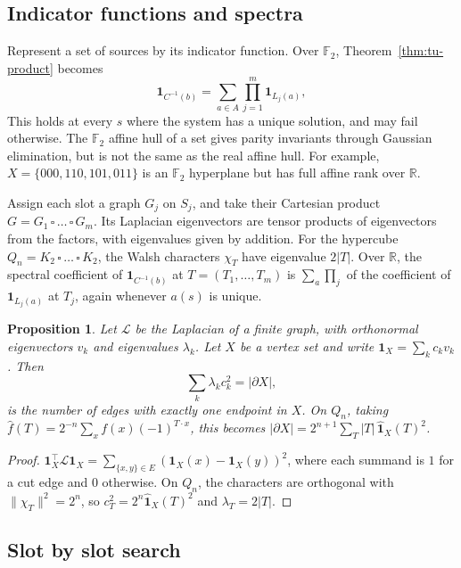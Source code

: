 \documentclass[11pt]{article}
\newtheorem{proposition}[theorem]{Proposition}
\theoremstyle{definition}
\theoremstyle{remark}
\newcommand{\F}{\mathbb{F}}
\begin{document}
\subsection{Indicator functions and spectra}

Represent a set of sources by its indicator function. Over $\F_2$, Theorem~\ref{thm:tu-product} becomes
\[
  \mathbf{1}_{C^{-1}(b)} = \sum_{a \in A} \prod_{j=1}^m \mathbf{1}_{L_j(a)},
\]
This holds at every $s$ where the system has a unique solution, and may fail otherwise. The $\F_2$ affine hull of a set gives parity invariants through Gaussian elimination, but is not the same as the real affine hull. For example, $X = \{000, 110, 101, 011\}$ is an $\F_2$ hyperplane but has full affine rank over $\mathbb{R}$.

Assign each slot a graph $G_j$ on $S_j$, and take their Cartesian product $G = G_1 \,\square\, \dots \,\square\, G_m$. Its Laplacian eigenvectors are tensor products of eigenvectors from the factors, with eigenvalues given by addition. For the hypercube $Q_n = K_2 \,\square\, \dots \,\square\, K_2$, the Walsh characters $\chi_T$ have eigenvalue $2|T|$. Over $\mathbb{R}$, the spectral coefficient of $\mathbf{1}_{C^{-1}(b)}$ at $T = (T_1, \dots, T_m)$ is $\sum_a \prod_j$ of the coefficient of $\mathbf{1}_{L_j(a)}$ at $T_j$, again whenever $a(s)$ is unique.

\begin{proposition}
Let $\mathcal{L}$ be the Laplacian of a finite graph, with orthonormal eigenvectors $v_k$ and eigenvalues $\lambda_k$. Let $X$ be a vertex set and write $\mathbf{1}_X = \sum_k c_k v_k$. Then
\[
  \sum_k \lambda_k c_k^2 = |\partial X|,
\]
is the number of edges with exactly one endpoint in $X$. On $Q_n$, taking $\hat f(T) = 2^{-n} \sum_x f(x) (-1)^{T \cdot x}$, this becomes $|\partial X| = 2^{n+1} \sum_T |T| \, \hat{\mathbf{1}}_X(T)^2$.
\end{proposition}

\begin{proof}
$\mathbf{1}_X^\top \mathcal{L} \mathbf{1}_X = \sum_{\{x,y\} \in E} (\mathbf{1}_X(x) - \mathbf{1}_X(y))^2$, where each summand is $1$ for a cut edge and $0$ otherwise. On $Q_n$, the characters are orthogonal with $\|\chi_T\|^2 = 2^n$, so $c_T^2 = 2^n \hat{\mathbf{1}}_X(T)^2$ and $\lambda_T = 2|T|$.
\end{proof}

\subsection{Slot by slot search}
\end{document}
